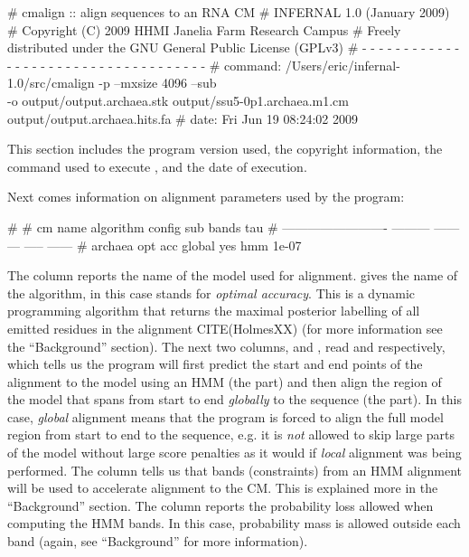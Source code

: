 \begin{sreoutput}
# cmalign :: align sequences to an RNA CM
# INFERNAL 1.0 (January 2009)
# Copyright (C) 2009 HHMI Janelia Farm Research Campus
# Freely distributed under the GNU General Public License (GPLv3)
# - - - - - - - - - - - - - - - - - - - - - - - - - - - - - - - - - - - -
# command: /Users/eric/infernal-1.0/src/cmalign -p --mxsize 4096 --sub \\
-o output/output.archaea.stk output/ssu5-0p1.archaea.m1.cm output/output.archaea.hits.fa
# date:    Fri Jun 19 08:24:02 2009
\end{sreoutput}

This section includes the program version used, the copyright
information, the command used to execute , and the date
of execution.

Next comes information on alignment parameters used by the program:

\begin{sreoutput}
#
# cm name                    algorithm  config  sub  bands     tau
# -------------------------  ---------  ------  ---  -----  ------
# archaea                      opt acc  global  yes    hmm   1e-07
\end{sreoutput}

The  column reports the name of the model used for
alignment.  gives the name of the algorithm, in this
case  stands for \emph{optimal accuracy}. This is a
dynamic programming algorithm that returns the maximal posterior
labelling of all emitted residues in the alignment CITE(HolmesXX) (for
more information see the ``Background'' section). The next two
columns,  and , read  and
 respectively, which tells us the program will first predict
the start and end points of the alignment to the model using an HMM
(the  part) and then align the region of the model that
spans from start to end \emph{globally} to the sequence (the
 part). In this case, \emph{global} alignment means that
the program is forced to align the full model region from start to end
to the sequence, e.g. it is \emph{not} allowed to skip large parts of
the model without large score penalties as it would if \emph{local}
alignment was being performed. The  column tells us that
bands (constraints) from an HMM alignment will be used to accelerate
alignment to the CM. This is explained more in the ``Background''
section. The  column reports the probability loss allowed
when computing the HMM bands. In this case,  probability
mass is allowed outside each band (again, see ``Background'' for more
information).

